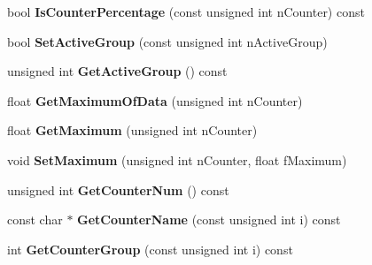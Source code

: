 \begin{DoxyCompactItemize}
\item 
\hypertarget{class_c_p_v_r_scope_graph_a3ce573c5abd3186b0a8f8b750ad4bfe1}{bool {\bfseries Is\+Counter\+Percentage} (const unsigned int n\+Counter) const }\label{class_c_p_v_r_scope_graph_a3ce573c5abd3186b0a8f8b750ad4bfe1}

\item 
\hypertarget{class_c_p_v_r_scope_graph_acd9f8df5c9682bb55d4ce3f0bfb2ba2a}{bool {\bfseries Set\+Active\+Group} (const unsigned int n\+Active\+Group)}\label{class_c_p_v_r_scope_graph_acd9f8df5c9682bb55d4ce3f0bfb2ba2a}

\item 
\hypertarget{class_c_p_v_r_scope_graph_a15277cbde55df36d9abd32d020b30b9c}{unsigned int {\bfseries Get\+Active\+Group} () const }\label{class_c_p_v_r_scope_graph_a15277cbde55df36d9abd32d020b30b9c}

\item 
\hypertarget{class_c_p_v_r_scope_graph_a01267ee7cd06885453231b613ac5eb02}{float {\bfseries Get\+Maximum\+Of\+Data} (unsigned int n\+Counter)}\label{class_c_p_v_r_scope_graph_a01267ee7cd06885453231b613ac5eb02}

\item 
\hypertarget{class_c_p_v_r_scope_graph_aade79e3b899ecc00c6c31dd0c08f1ad7}{float {\bfseries Get\+Maximum} (unsigned int n\+Counter)}\label{class_c_p_v_r_scope_graph_aade79e3b899ecc00c6c31dd0c08f1ad7}

\item 
\hypertarget{class_c_p_v_r_scope_graph_ad34737bfd827729a83b5373bbecc62ac}{void {\bfseries Set\+Maximum} (unsigned int n\+Counter, float f\+Maximum)}\label{class_c_p_v_r_scope_graph_ad34737bfd827729a83b5373bbecc62ac}

\item 
\hypertarget{class_c_p_v_r_scope_graph_ab24ef108998a664edfb3e0ee260fd3b7}{unsigned int {\bfseries Get\+Counter\+Num} () const }\label{class_c_p_v_r_scope_graph_ab24ef108998a664edfb3e0ee260fd3b7}

\item 
\hypertarget{class_c_p_v_r_scope_graph_a3a58365027d04777eb72163fd6e39519}{const char $\ast$ {\bfseries Get\+Counter\+Name} (const unsigned int i) const }\label{class_c_p_v_r_scope_graph_a3a58365027d04777eb72163fd6e39519}

\item 
\hypertarget{class_c_p_v_r_scope_graph_ab9b348ea0b767b8598f8edbb71059402}{int {\bfseries Get\+Counter\+Group} (const unsigned int i) const }\label{class_c_p_v_r_scope_graph_ab9b348ea0b767b8598f8edbb71059402}


\end{DoxyCompactItemize}
